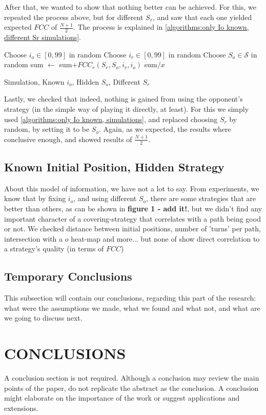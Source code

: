 \documentclass[a4paper,10pt]{article}
\newcommand\rob{\ensuremath{r}\xspace}
\newcommand\opp{\ensuremath{o}\xspace}
\newcommand{\fcc}{\ensuremath{FCC}\xspace}
\begin{document}
After that, we wanted to show that nothing better can be achieved. For this, we repeated the process above, but for different $S_{\rob}$, and saw that each one yielded expected \fcc of $\frac{N+1}{2}$. The process is explained in \ref{algorithms:only Io known, different Sr simulations}.
\begin{algorithm}
\begin{algorithmic}
	\FOR {$S_{\rob} \in \mathcal{S}$}
    	\STATE Choose $i_{\opp} \in \left[0,99\right]$ in random
          \STATE Choose $i_{\rob} \in \left[0,99\right]$ in random
          \STATE Choose $S_{\opp} \in \mathcal{S}$ in random
          \STATE sum $\leftarrow $ sum$+ {\fcc}_{\rob}(S_{\rob},S_{\opp}, i_{\rob}, i_{\opp})$
      \ENDFOR
    \RETURN sum$/x$
    \ENDFOR
    
  
\end{algorithmic}
\caption{Simulation, Known $i_{\opp}$, Hidden $S_{\opp}$, Different $S_r$\label{algorithms:only Io known, different Sr simulations}}
\end{algorithm}

Lastly, we checked that indeed, nothing is gained from using the opponent's strategy (in the simple way of playing it directly, at least). For this we simply used \ref{algorithms:only Io known, simulations}, and replaced choosing $S_{\rob}$ by random, by setting it to be $S_{\opp}$. Again, as we expected, the results where conclusive enough, and showed results of $\frac{N+1}{2}$.


\subsection{Known Initial Position, Hidden Strategy}
About this model of information, we have not a lot to say. From experiments, we know that by fixing $i_{\opp}$, and using different $S_{\opp}$, there are some strategies that are better than others, as can be shown in \textbf{figure 1 - add it!}, but we didn't find any important character of a covering-strategy that correlates with a path being good or not. We checked distance between initial positions, number of 'turns' per path, intersection with a \opp heat-map and more... but none of show direct correlation to a strategy's quality (in terms of \fcc)

\subsection{Temporary Conclusions}
This subsection will contain our conclusions, regarding this part of the research: what were the assumptions we made, what we found and what not, and what are we going to discuss next.
\section{CONCLUSIONS}

A conclusion section is not required. Although a conclusion may review the main points of the paper, do not replicate the abstract as the conclusion. A conclusion might elaborate on the importance of the work or suggest applications and extensions. 





\end{document}
